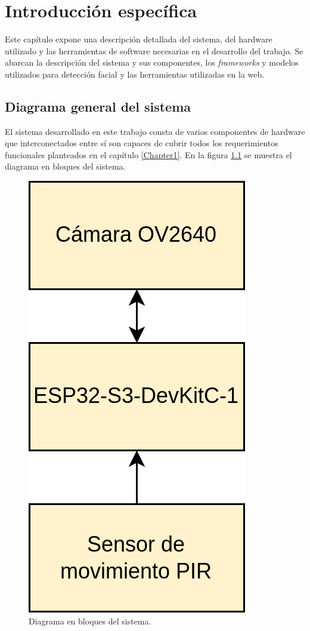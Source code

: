 \chapter{Introducción específica} %

\label{Chapter2}

Este capítulo expone una descripción detallada del sistema, del hardware utilizado y las herramientas de  software necesarias en el desarrollo del trabajo. Se abarcan la descripción del sistema y sus componentes, los \textit{frameworks} y modelos utilizados para detección facial y las herramientas utilizadas en la web.

\section{Diagrama general del sistema}
El sistema desarrollado en este trabajo consta de varios componentes de hardware que interconectados entre sí son capaces de cubrir todos los requerimientos funcionales planteados en el capítulo \ref{Chapter1}. En la figura \ref{fig:sys_blocks} se muestra el diagrama en bloques del sistema.

\begin{figure}[h]
	\centering
	\includegraphics[scale=0.25]{./Figures/sys_blocks.png}
	\caption{Diagrama en bloques del sistema.}
	\label{fig:sys_blocks}
\end{figure}

